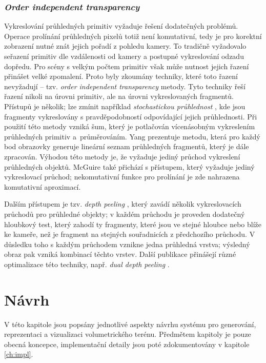 
\subsection{\textit{Order independent transparency}}
Vykreslování průhledných primitiv vyžaduje řešení dodatečných problémů. Operace prolínání průhledných pixelů totiž není komutativní, tedy je pro korektní zobrazení nutné znát jejich pořadí z pohledu kamery. To tradičně vyžadovalo seřazení primitiv dle vzdálenosti od kamery a postupné vykreslování odzadu dopředu. Pro scény s velkým počtem primitiv však může nutnost jejich řazení přinášet velké zpomalení. Proto byly zkoumány techniky, které toto řazení nevyžadují -- tzv. \textit{order independent transparency} metody. Tyto techniky řeší řazení nikoli na úrovni primitiv, ale na úrovni vykreslovaných fragmentů. Přístupů je několik; lze zmínit například \textit{stochastickou průhlednost} \cite{EndertonE.2011ST}, kde jsou fragmenty vykreslovány s pravděpodobností odpovídající jejich průhlednosti. Při použití této metody vzniká šum, který je potlačován vícenásobným vykreslením průhledných primitiv a~průměrováním. Yang \cite{YangJasonC.2010RCLL} prezentuje metodu, která pro každý bod obrazovky generuje lineární seznam průhledných fragmentů, který je dále zpracován. Výhodou této metody je, že vyžaduje jediný průchod vykreslení průhledných objektů. McGuire \cite{McGuire2013Transparency} také přichází s přístupem, který vyžaduje jediný vykreslovací průchod; nekomutativní funkce pro prolínání je zde nahrazena komutativní aproximací.

Dalším přístupem je tzv. \textit{depth peeling} \cite{Everitt01interactiveorder}, který zavádí několik vykreslovacích průchodů pro průhledné objekty; v každém průchodu je proveden dodatečný hloubkový test, který zahodí ty fragmenty, které jsou ve stejné hloubce nebo blíže ke kameře, než je fragment na stejných souřadnicích z předchozího průchodu. V důsledku toho s každým průchodem vznikne jedna průhledná vrstva; výsledný obraz pak vzniká kombinací těchto vrstev. Další publikace přinášejí různé optimalizace této techniky, např. \textit{dual depth peeling} \cite{Bavoil08orderindependent}.

\chapter{Návrh} \label{ch:design}
V této kapitole jsou popsány jednotlivé aspekty návrhu systému pro generování, reprezentaci a vizualizaci volumetrického terénu. Předmětem kapitoly je pouze obecná koncepce, implementační detaily jsou poté zdokumentovány v kapitole \ref{ch:impl}.

